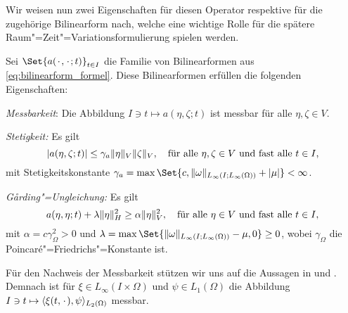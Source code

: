 \documentclass[../main.tex]{subfiles}
\begin{document}
Wir weisen nun zwei Eigenschaften für diesen Operator respektive für die zugehörige Bilinearform nach, welche eine wichtige Rolle für die spätere Raum"=Zeit"=Variationsformulierung spielen werden.

\begin{Satz}
\label{satz:bilinearform_messbar_stetig_garding}
    Sei $\Set{a(\blank, \blank; t)}_{t \in I}$ die Familie von Bilinearformen aus \cref{eq:bilinearform_formel}.
    Diese Bilinearformen erfüllen die folgenden Eigenschaften:
    \begin{thmenumerate}
        \item\label{satz:bilinearform_messbar_stetig_garding:messbar}
        \emph{Messbarkeit}: Die Abbildung $I \ni t \mapsto a(\eta, \zeta; t)$ ist messbar für alle $\eta, \zeta \in V$.
        \item\label{satz:bilinearform_messbar_stetig_garding:stetig}
        \emph{Stetigkeit:} Es gilt
        \begin{equation}
            \label{eq:bilinearform_messbar_stetig_garding:stetig}
            \abs{a(\eta, \zeta; t)} \leq \gamma_{a} \norm{\eta}_{V} \norm{\zeta}_{V}, \quad \fa \eta, \zeta \in V \text{ und fast alle } t \in I,
        \end{equation}
        mit Stetigkeitskonstante $\gamma_{a} = \max\Set{c, \norm{\omega}_{L_{\infty}(I; L_{\infty}(\Omega))} + \abs{\mu}} < \infty$.
        \item\label{satz:bilinearform_messbar_stetig_garding:garding}
        \emph{G\aa{}rding"=Ungleichung:} Es gilt
        \begin{equation}
            \label{eq:bilinearform_messbar_stetig_garding:garding}
            a(\eta, \eta; t) + \lambda \norm{\eta}_{H}^{2} \geq \alpha \norm{\eta}_{V}^{2}, \quad \fa \eta \in V \text{ und fast alle } t \in I,
        \end{equation}
        mit $\alpha = c \gamma_{\Omega}^{2} > 0$ und $\lambda = \max\Set{\norm{\omega}_{L_{\infty}(I; L_{\infty}(\Omega))} - \mu, 0} \geq 0$, wobei $\gamma_{\Omega}$ die Poincaré"=Friedrichs"=Konstante ist.
    \end{thmenumerate}

    \begin{Beweis}
        Für den Nachweis der Messbarkeit stützen wir uns auf die Aussagen in \cite[177]{fattorini2005infinite} und \cite[Theorem 2.7.9, Corollary 2.7.10, Lemma 8.1.1]{Andreev:2012ep}.
        Demnach ist für $\xi \in L_{\infty}(I \times \Omega)$ und $\psi \in L_{1}(\Omega)$ die Abbildung $I \ni t \mapsto \langle\xi(t, {\mkern2mu\cdot\mkern2mu}),\psi\rangle_{L_{2}(\Omega)}$ messbar.


\end{Beweis}
\end{Satz}
\end{document}
